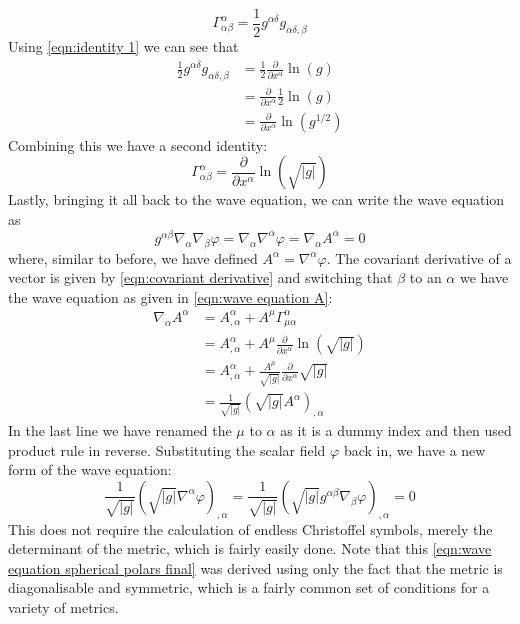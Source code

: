 \documentclass[11pt]{article}
\numberwithin{equation}{section}
\numberwithin{figure}{section}
\numberwithin{table}{section}
\begin{document}
\begin{equation*}
    \Gamma^\alpha_{\alpha\beta}=\frac{1}{2}g^{\alpha\delta}g_{\alpha\delta,\beta}
\end{equation*}
Using \cref{eqn:identity 1} we can see that 
\begin{align*}
    \frac{1}{2}g^{\alpha\delta}g_{\alpha\delta,\beta}&=\frac{1}{2}\frac{\partial}{\partial x^\alpha}\ln(g)\\
    &=\frac{\partial}{\partial x^\alpha}\frac{1}{2}\ln(g)\\
    &=\frac{\partial}{\partial x^\alpha}\ln(g^{1/2})
\end{align*}
Combining this we have a second identity:
\begin{equation}
    \Gamma^\alpha_{\alpha\beta}=\frac{\partial}{\partial x^\alpha}\ln(\sqrt{|g|})
    \label{eqn:identity 2}
\end{equation}
Lastly, bringing it all back to the wave equation, we can write the wave equation as 
\begin{equation}
    g^{\alpha\beta}\nabla_\alpha\nabla_\beta \varphi=\nabla_\alpha\nabla^\alpha \varphi=\nabla_\alpha A^\alpha=0
    \label{eqn:wave equation A}
\end{equation}
where, similar to before, we have defined $A^\alpha = \nabla^\alpha \varphi$. The covariant derivative of a vector is given by \cref{eqn:covariant derivative} and switching that $\beta$ to an $\alpha$ we have the wave equation as given in \cref{eqn:wave equation A}:
\begin{align*}
    \nabla_\alpha A^\alpha&=A^\alpha_{,\alpha}+A^\mu\Gamma^{\alpha}_{\mu\alpha}\\
    &=A^\alpha_{,\alpha}+A^\mu\frac{\partial}{\partial x^\alpha}\ln(\sqrt{|g|})\\
    &=A^\alpha_{,\alpha}+\frac{A^\mu}{\sqrt{|g|}}\frac{\partial}{\partial x^\alpha}\sqrt{|g|}\\
    &=\frac{1}{\sqrt{|g|}}(\sqrt{|g|}A^\alpha)_{,\alpha}
\end{align*}
In the last line we have renamed the $\mu$ to $\alpha$ as it is a dummy index and then used product rule in reverse. Substituting the scalar field $\varphi$ back in, we have a new form of the wave equation:
\begin{equation}
    \frac{1}{\sqrt{|g|}}(\sqrt{|g|}\nabla^\alpha\varphi)_{,\alpha}=\frac{1}{\sqrt{|g|}}(\sqrt{|g|}g^{\alpha\beta}\nabla_\beta\varphi)_{,\alpha}=0
    \label{eqn:wave equation spherical polars final}
\end{equation}
This does not require the calculation of endless Christoffel symbols, merely the determinant of the metric, which is fairly easily done. Note that this \cref{eqn:wave equation spherical polars final} was derived using only the fact that the metric is diagonalisable and symmetric, which is a fairly common set of conditions for a variety of metrics.
\end{document}
